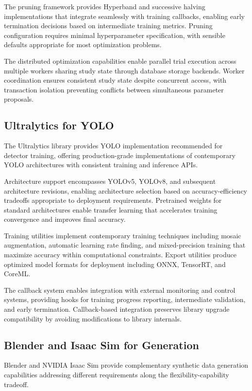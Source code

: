 The pruning framework provides Hyperband and successive halving implementations that integrate seamlessly with training callbacks, enabling early termination decisions based on intermediate training metrics. Pruning configuration requires minimal hyperparameter specification, with sensible defaults appropriate for most optimization problems.

The distributed optimization capabilities enable parallel trial execution across multiple workers sharing study state through database storage backends. Worker coordination ensures consistent study state despite concurrent access, with transaction isolation preventing conflicts between simultaneous parameter proposals.

\subsection{Ultralytics for YOLO}

The Ultralytics library provides YOLO implementation recommended for detector training, offering production-grade implementations of contemporary YOLO architectures with consistent training and inference APIs.

Architecture support encompasses YOLOv5, YOLOv8, and subsequent architecture revisions, enabling architecture selection based on accuracy-efficiency tradeoffs appropriate to deployment requirements. Pretrained weights for standard architectures enable transfer learning that accelerates training convergence and improves final accuracy.

Training utilities implement contemporary training techniques including mosaic augmentation, automatic learning rate finding, and mixed-precision training that maximize accuracy within computational constraints. Export utilities produce optimized model formats for deployment including ONNX, TensorRT, and CoreML.

The callback system enables integration with external monitoring and control systems, providing hooks for training progress reporting, intermediate validation, and early termination. Callback-based integration preserves library upgrade compatibility by avoiding modifications to library internals.

\subsection{Blender and Isaac Sim for Generation}

Blender and NVIDIA Isaac Sim provide complementary synthetic data generation capabilities addressing different requirements along the flexibility-capability tradeoff.

